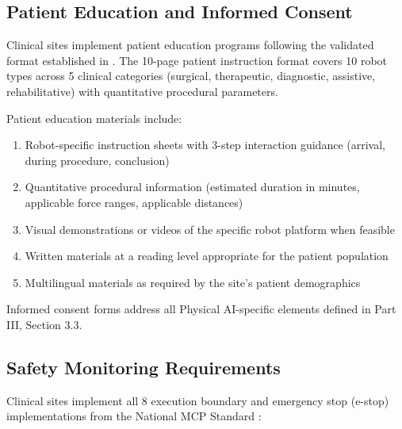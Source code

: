 \documentclass[11pt,letterpaper]{article}
\begin{document}
\subsection{Patient Education and Informed Consent}

Clinical sites \SHALL{} implement patient education programs following the validated format established in \cite{kawchak2026patient}. The 10-page patient instruction format covers 10 robot types across 5 clinical categories (surgical, therapeutic, diagnostic, assistive, rehabilitative) with quantitative procedural parameters.

Patient education materials \SHALL{} include:

\begin{enumerate}
  \item Robot-specific instruction sheets with 3-step interaction guidance (arrival, during procedure, conclusion)
  \item Quantitative procedural information (estimated duration in minutes, applicable force ranges, applicable distances)
  \item Visual demonstrations or videos of the specific robot platform when feasible
  \item Written materials at a reading level appropriate for the patient population
  \item Multilingual materials as required by the site's patient demographics
\end{enumerate}

Informed consent forms \SHALL{} address all Physical AI-specific elements defined in Part III, Section 3.3.

\subsection{Safety Monitoring Requirements}

Clinical sites \SHALL{} implement all 8 execution boundary and emergency stop (e-stop) implementations from the National MCP Standard \cite{kawchak2026nationalmcp}:
\end{document}
